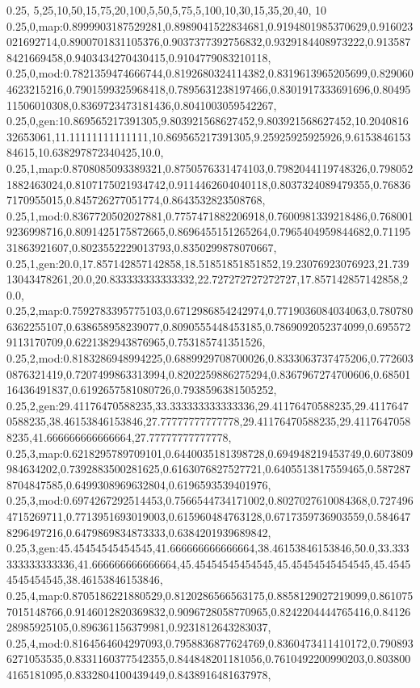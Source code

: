 0.25,
5,25,10,50,15,75,20,100,5,50,5,75,5,100,10,30,15,35,20,40,
10
0.25,0,map:0.8999903187529281,0.8989041522834681,0.9194801985370629,0.916023021692714,0.8900701831105376,0.9037377392756832,0.9329184408973222,0.9135878421669458,0.9403434270430415,0.9104779083210118,
0.25,0,mod:0.7821359474666744,0.8192680324114382,0.8319613965205699,0.8290604623215216,0.7901599325968418,0.7895631238197466,0.8301917333691696,0.8049511506010308,0.8369723473181436,0.8041003059542267,
0.25,0,gen:10.869565217391305,9.803921568627452,9.803921568627452,10.204081632653061,11.11111111111111,10.869565217391305,9.25925925925926,9.615384615384615,10.638297872340425,10.0,
0.25,1,map:0.8708085093389321,0.8750576331474103,0.7982044119748326,0.7980521882463024,0.8107175021934742,0.9114462604040118,0.8037324089479355,0.768367170955015,0.845726277051774,0.8643532823508768,
0.25,1,mod:0.8367720502027881,0.7757471882206918,0.7600981339218486,0.7680019236998716,0.8091425175872665,0.8696455151265264,0.7965404959844682,0.7119531863921607,0.8023552229013793,0.8350299878070667,
0.25,1,gen:20.0,17.857142857142858,18.51851851851852,19.23076923076923,21.73913043478261,20.0,20.833333333333332,22.727272727272727,17.857142857142858,20.0,
0.25,2,map:0.7592783395775103,0.6712986854242974,0.7719036084034063,0.7807806362255107,0.638658958239077,0.8090555448453185,0.7869092052374099,0.6955729113170709,0.6221382943876965,0.753185741351526,
0.25,2,mod:0.8183286948994225,0.6889929708700026,0.8333063737475206,0.7726030876321419,0.7207499863313994,0.8202259886275294,0.8367967274700606,0.6850116436491837,0.6192657581080726,0.7938596381505252,
0.25,2,gen:29.41176470588235,33.333333333333336,29.41176470588235,29.41176470588235,38.46153846153846,27.77777777777778,29.41176470588235,29.41176470588235,41.666666666666664,27.77777777777778,
0.25,3,map:0.6218295789709101,0.6440035181398728,0.694948219453749,0.6073809984634202,0.7392883500281625,0.6163076827527721,0.6405513817559465,0.5872878704847585,0.6499308969632804,0.6196593539401976,
0.25,3,mod:0.6974267292514453,0.7566544734171002,0.8027027610084368,0.7274964715269711,0.7713951693019003,0.615960484763128,0.6717359736903559,0.5846478296497216,0.6479869834873333,0.6384201939689842,
0.25,3,gen:45.45454545454545,41.666666666666664,38.46153846153846,50.0,33.333333333333336,41.666666666666664,45.45454545454545,45.45454545454545,45.45454545454545,38.46153846153846,
0.25,4,map:0.8705186221880529,0.8120286566563175,0.8858129027219099,0.8610757015148766,0.9146012820369832,0.9096728058770965,0.8242204444765416,0.8412628985925105,0.896361156379981,0.9231812643283037,
0.25,4,mod:0.8164564604297093,0.7958836877624769,0.8360473411410172,0.7908936271053535,0.8331160377542355,0.844848201181056,0.7610492200990203,0.8038004165181095,0.8332804100439449,0.8438916481637978,
